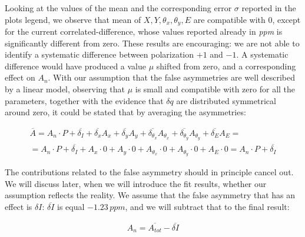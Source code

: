 Looking at the values of the mean and the corresponding error $\sigma$ reported in the plots legend, we observe that mean of $X,Y,\theta_{x},\theta_{y},E$ are compatible with $0$, except for the current correlated-difference, whose values reported already in \textit{ppm} is significantly different from zero. These results are encouraging: we are not able to identify a systematic difference between polarization $+1$ and $-1$. A systematic difference would have produced a value $\mu$ shifted from zero, and a corresponding effect on $A_{n}$. 
With our assumption that the false asymmetries are well described by a linear model, observing that $\mu$ is small and compatible with zero for all the parameters, together with the evidence that $\delta q$ are distributed symmetrical around zero, it could be stated that by averaging the asymmetries:

\begin{align*}
\overline{A} = A_{n} \cdot P + \overline{\delta_{I}} + \overline{\delta_{x}}A_{x} + \overline{\delta_{y}} A_{y} + \overline{\delta_{\theta_{x}}} A_{\theta_{x}} + \overline{\delta_{\theta_{y}}} A_{\theta_{y}} + \overline{\delta_{E}}A_{E} =\\= A_{n} \cdot P + \overline{\delta_{I}} + A_{x}\cdot 0 + A_{y} \cdot 0 +  A_{\theta_{x}} \cdot 0 +  A_{\theta_{y}} \cdot 0 + A_{E} \cdot 0 = A_{n} \cdot P + \overline{\delta_{I}}
\end{align*}  

The contributions related to the false asymmetry should in principle cancel out. We will discuss later, when we will introduce the fit results, whether our assumption reflects the reality. We assume that the false asymmetry that has an effect is $\delta I$: $\overline{\delta I}$ is equal $-1.23 \, ppm$, and we will subtract that to the final result:

\begin{align*}
A_{n} = \overline{A_{tot}} - \overline{\delta I}
\end{align*}

